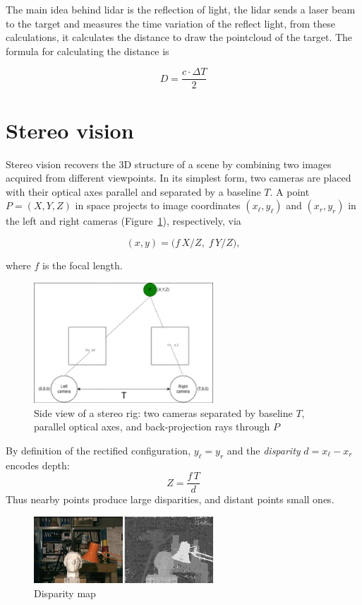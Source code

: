 The main idea behind \gls{lidar} is the reflection of light, the \gls{lidar} sends a laser beam to the target and measures the time variation of the reflect light, from these calculations, it calculates the distance to draw the pointcloud of the target. The formula for calculating the distance is

\begin{equation}
  D = \frac{c \cdot \Delta T}{2}
  \label{eq:1}
\end{equation}

\section{Stereo vision}

Stereo vision recovers the 3D structure of a scene by combining two images acquired from different viewpoints. In its simplest form, two cameras are placed with their optical axes parallel and separated by a baseline \(T\). A point \(P=(X,Y,Z)\) in space projects to image coordinates \((x_\ell,y_\ell)\) and \((x_r,y_r)\) in the left and right cameras (Figure~\ref{fig:stereo-rig}), respectively, via

\[
  (x,y) = \bigl(f\,X/Z,\;f\,Y/Z\bigr),
\]

where \(f\) is the focal length.

\begin{figure}[H]
  \centering
  \includegraphics[width=0.6\textwidth]{imgs/rig.png}
  \caption{Side view of a stereo rig: two cameras separated by baseline \(T\), parallel optical axes, and back-projection rays through \(P\)}
  \label{fig:stereo-rig}
\end{figure}

By definition of the rectified configuration, \(y_\ell = y_r\) and the \emph{disparity} \(d = x_\ell - x_r\) encodes depth:
\[
  Z = \frac{f\,T}{d}
\]
Thus nearby points produce large disparities, and distant points small ones.

\begin{figure}[H]
  \centering
  \includegraphics[width=0.6\textwidth]{imgs/A-reference-image-and-its-estimated-disparity-map-The-disparity-map-appears-noisy-since_W640.jpg}
  \caption{Disparity map~\cite{inproceedings}}
  \label{fig:disparity-map}
\end{figure}

